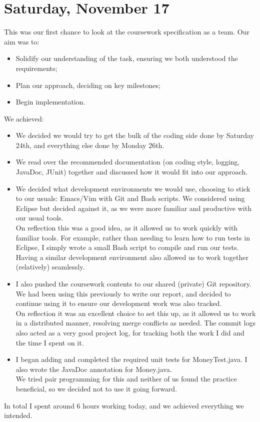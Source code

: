 \documentclass[titlepage, 12pt]{extarticle}
\begin{document}
\section{Saturday, November 17}
This was our first chance to look at the coursework specification as a team.
Our aim was to:
\begin{itemize}
\item Solidify our understanding of the task, ensuring we both understood the requirements;
\item Plan our approach, deciding on key milestones;
\item Begin implementation.
\end{itemize}
We achieved:
\begin{itemize}
\item  We decided we would try to get the bulk of the coding side done by Saturday 24th, and everything else done by Monday 26th.
\item We read over the recommended documentation (on coding style, logging, JavaDoc, JUnit) together and discussed how it would fit into our approach.
\item We decided what development environments we would use, choosing to stick to our usuals: Emacs/Vim with Git and Bash scripts. We considered using Eclipse but decided against it, as we were more familiar and productive with our usual tools. \\ On reflection this was a good idea, as it allowed us to work quickly with familiar tools. For example, rather than needing to learn how to run tests in Eclipse, I simply wrote a small Bash script to compile and run our tests. Having a similar development environment also allowed us to work together (relatively) seamlessly.
\item I also pushed the coursework contents to our shared (private) Git repository. We had been using this previously to write our report, and decided to continue using it to ensure our development work was also tracked. \\ On reflection it was an excellent choice to set this up, as it allowed us to work in a distributed manner, resolving merge conflicts as needed. The commit logs also acted as a very good project log, for tracking both the work I did and the time I spent on it.
\item I began adding and completed the required unit tests for MoneyTest.java. I also wrote the JavaDoc annotation for Money.java. \\ We tried pair programming for this and neither of us found the practice beneficial, so we decided not to use it going forward. 
\end{itemize}
In total I spent around 6 hours working today, and we achieved everything we intended. 
\end{document}

